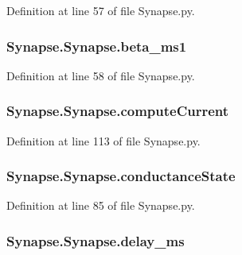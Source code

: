 Definition at line 57 of file Synapse.\-py.

\hypertarget{class_synapse_1_1_synapse_ab59f413cbd21555531be209dee307a97}{
\subsubsection[{beta\-\_\-ms1}]{\setlength{\rightskip}{0pt plus 5cm}Synapse.\-Synapse.\-beta\-\_\-ms1}}\label{class_synapse_1_1_synapse_ab59f413cbd21555531be209dee307a97}


Definition at line 58 of file Synapse.\-py.

\hypertarget{class_synapse_1_1_synapse_a9f68cb297a4bc98c4cb9d5c042b5d0d6}{
\subsubsection[{compute\-Current}]{\setlength{\rightskip}{0pt plus 5cm}Synapse.\-Synapse.\-compute\-Current}}\label{class_synapse_1_1_synapse_a9f68cb297a4bc98c4cb9d5c042b5d0d6}


Definition at line 113 of file Synapse.\-py.

\hypertarget{class_synapse_1_1_synapse_a89d3762daa9c60be63403a5ce9fd9a84}{
\subsubsection[{conductance\-State}]{\setlength{\rightskip}{0pt plus 5cm}Synapse.\-Synapse.\-conductance\-State}}\label{class_synapse_1_1_synapse_a89d3762daa9c60be63403a5ce9fd9a84}


Definition at line 85 of file Synapse.\-py.

\hypertarget{class_synapse_1_1_synapse_a14adfda48133bd314f4dcd65fc9a2366}{
\subsubsection[{delay\-\_\-ms}]{\setlength{\rightskip}{0pt plus 5cm}Synapse.\-Synapse.\-delay\-\_\-ms}}\label{class_synapse_1_1_synapse_a14adfda48133bd314f4dcd65fc9a2366}



